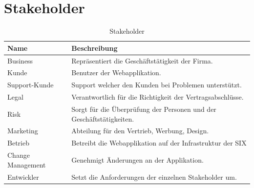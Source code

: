 \section{Stakeholder}

\begin{table}[H]
	\centering
	\caption{Stakeholder}
	\begin{tabular}{ | p{3cm} | p{13cm} | }
		\toprule
		{\textbf{Name}} & {\textbf{Beschreibung}} \\
		\midrule
		Business & Repräsentiert die Geschäftstätigkeit der Firma.\\ \hline
		Kunde & Benutzer der Webapplikation. \\ \hline
		Support-Kunde & Support welcher den Kunden bei Problemen unterstützt. \\ \hline
		Legal &  Verantwortlich für die Richtigkeit der Vertragsabschlüsse. \\ \hline
		Risk & Sorgt für die Überprüfung der Personen und der Geschäftstätigkeiten. \\ \hline
		Marketing & Abteilung für den Vertrieb, Werbung, Design. \\ \hline
		Betrieb & Betreibt die Webapplikation auf der Infrastruktur der SIX \\ \hline
		Change Management & Genehmigt Änderungen an der Applikation. \\ \hline
		Entwickler & Setzt die Anforderungen der einzelnen Stakeholder um. \\  \hline
		\bottomrule
	\end{tabular}
\end{table}
